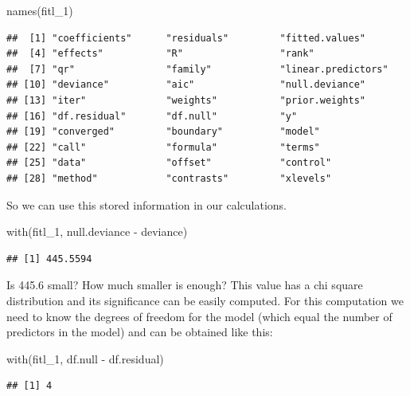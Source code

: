 \documentclass[
]{book}
\newenvironment{Shaded}{\begin{snugshade}}{\end{snugshade}}
\newcommand{\FunctionTok}[1]{\textcolor[rgb]{0.00,0.00,0.00}{#1}}
\newcommand{\NormalTok}[1]{#1}
\newcommand{\SpecialCharTok}[1]{\textcolor[rgb]{0.00,0.00,0.00}{#1}}
\begin{document}
\begin{Shaded}
\begin{Highlighting}[]
\FunctionTok{names}\NormalTok{(fitl\_1)}
\end{Highlighting}
\end{Shaded}

\begin{verbatim}
##  [1] "coefficients"      "residuals"         "fitted.values"    
##  [4] "effects"           "R"                 "rank"             
##  [7] "qr"                "family"            "linear.predictors"
## [10] "deviance"          "aic"               "null.deviance"    
## [13] "iter"              "weights"           "prior.weights"    
## [16] "df.residual"       "df.null"           "y"                
## [19] "converged"         "boundary"          "model"            
## [22] "call"              "formula"           "terms"            
## [25] "data"              "offset"            "control"          
## [28] "method"            "contrasts"         "xlevels"
\end{verbatim}

So we can use this stored information in our calculations.

\begin{Shaded}
\begin{Highlighting}[]
\FunctionTok{with}\NormalTok{(fitl\_1, null.deviance }\SpecialCharTok{{-}}\NormalTok{ deviance)}
\end{Highlighting}
\end{Shaded}

\begin{verbatim}
## [1] 445.5594
\end{verbatim}

Is 445.6 small? How much smaller is enough? This value has a chi square distribution and its significance can be easily computed. For this computation we need to know the degrees of freedom for the model (which equal the number of predictors in the model) and can be obtained like this:

\begin{Shaded}
\begin{Highlighting}[]
\FunctionTok{with}\NormalTok{(fitl\_1, df.null }\SpecialCharTok{{-}}\NormalTok{ df.residual)}
\end{Highlighting}
\end{Shaded}

\begin{verbatim}
## [1] 4
\end{verbatim}
\end{document}
